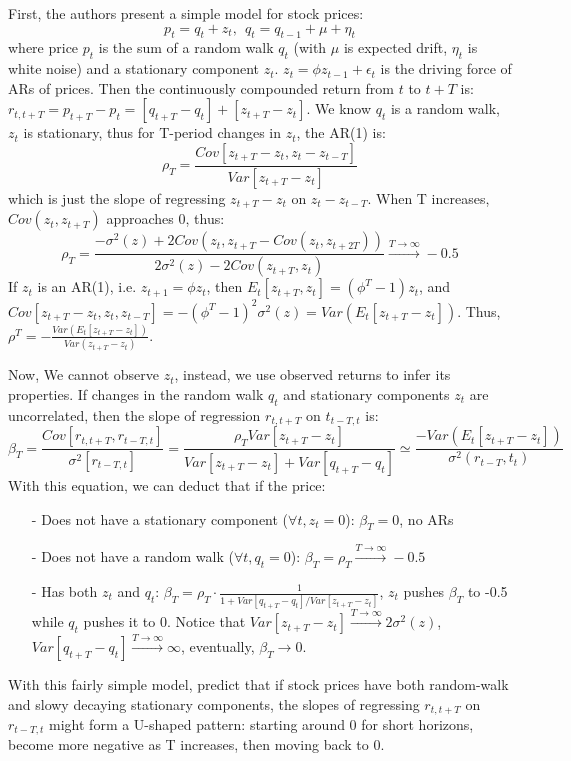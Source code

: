 First, the authors present a simple model for stock prices:
$$
p_t = q_t + z_t,\ \ q_t=q_{t-1} +\mu +\eta_t
$$
where price $p_t$ is the sum of a random walk $q_t$ (with $\mu$ is expected drift, $\eta_t$ is white noise) and a stationary component $z_t$. $z_t = \phi z_{t-1}+\epsilon_t$ is the driving force of ARs of prices.
Then the continuously compounded return from $t$ to $t+T$ is: $r_{t,t+T}=p_{t+T}-p_t=[q_{t+T}-q_t]+[z_{t+T}-z_t]$. We know $q_t$ is a random walk, $z_t$ is stationary, thus for T-period changes in $z_t$, the AR(1) is: 
$$
\rho_T = \frac{Cov[z_{t+T}-z_t,z_t-z_{t-T}]}{Var[z_{t+T}-z_t]}
$$
which is just the slope of regressing $z_{t+T}-z_t$ on $z_t-z_{t-T}$. When T increases, $Cov(z_t,z_{t+T})$ approaches 0, thus:
$$
\rho_{T} = \frac{-\sigma^2(z)+2Cov(z_t,z_{t+T}-Cov(z_t,z_{t+2T}))}{2\sigma^2(z) - 2Cov(z_{t+T},z_t)} \xrightarrow{T\rightarrow\infty}-0.5
$$
If $z_t$ is an AR(1), i.e. $z_{t+1} = \phi z_t$, then $E_t[z_{t+T},z_t]=(\phi^T-1)z_t$, and $Cov[z_{t+T}-z_t,z_t,z_{t-T}] = -(\phi^T-1)^2\sigma^2(z)= Var(E_t[z_{t+T}-z_t])$. Thus, $\rho^T = -\frac{Var(E_t[z_{t+T}-z_t])}{Var(z_{t+T}-z_t)}$.

Now, We cannot observe $z_t$, instead, we use observed returns to infer its properties. If changes in the random walk $q_t$ and stationary components $z_t$ are uncorrelated, then the slope of regression $r_{t,t+T}$ on $t_{t-T,t}$ is:
$$
\beta_T = \frac{Cov[r_{t,t+T},r_{t-T,t}]}{\sigma^2[r_{t-T,t}]}=\frac{\rho_T Var[z_{t+T}-z_t]}{Var[z_{t+T}-z_t]+Var[q_{t+T}-q_t]} \simeq \frac{-Var(E_t[z_{t+T}-z_t])}{\sigma^2(r_{t-T},t_t)}
$$
With this equation, we can deduct that if the price:
\begin{enumerate}
    \item[-] Does not have a stationary component ($\forall t, z_t=0$): $\beta_T=0$, no ARs
    \item[-] Does not have a random walk ($\forall t, q_t=0$): $\beta_T = \rho_T \xrightarrow{T\rightarrow \infty}-0.5$
    \item[-] Has both $z_t$ and $q_t$: $\beta_T = \rho_T \cdot \frac{1}{1+Var[q_{t+T}-q_t]/Var[z_{t+T}-z_t]}$, $z_t$ pushes $\beta_T$ to -0.5 while $q_t$ pushes it to 0. Notice that $Var[z_{t+T}-z_t]\xrightarrow{T\rightarrow \infty} 2\sigma^2(z)$, 
    $Var[q_{t+T}-q_t]\xrightarrow{T\rightarrow\infty}\infty$, eventually, $\beta_T \rightarrow 0$.
\end{enumerate}
With this fairly simple model, \citeauthor{fama1988permanent} predict that if stock prices have both random-walk and slowy decaying stationary components, the slopes of regressing $r_{t,t+T}$ on $r_{t-T,t}$ might form a U-shaped pattern: starting around 0
for short horizons, become more negative as T increases, then moving back to 0.

